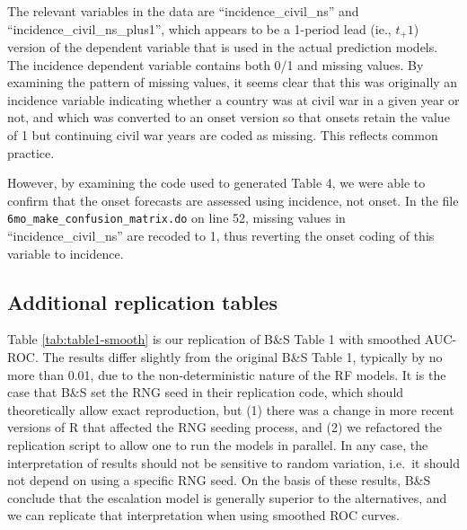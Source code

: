\documentclass[
]{article}
\begin{document}
The relevant variables in the data are ``incidence\_civil\_ns'' and ``incidence\_civil\_ns\_plus1'', which appears to be a 1-period lead (ie., \(t_+1\)) version of the dependent variable that is used in the actual prediction models. The incidence dependent variable contains both 0/1 and missing values. By examining the pattern of missing values, it seems clear that this was originally an incidence variable indicating whether a country was at civil war in a given year or not, and which was converted to an onset version so that onsets retain the value of 1 but continuing civil war years are coded as missing. This reflects common practice.

However, by examining the code used to generated Table 4, we were able to confirm that the onset forecasts are assessed using incidence, not onset. In the file \texttt{6mo\_make\_confusion\_matrix.do} on line 52, missing values in ``incidence\_civil\_ns'' are recoded to 1, thus reverting the onset coding of this variable to incidence.

\hypertarget{additional-replication-tables}{%
\subsection{Additional replication tables}\label{additional-replication-tables}}

Table \ref{tab:table1-smooth} is our replication of B\&S Table 1 with smoothed AUC-ROC. The results differ slightly from the original B\&S Table 1, typically by no more than 0.01, due to the non-deterministic nature of the RF models. It is the case that B\&S set the RNG seed in their replication code, which should theoretically allow exact reproduction, but (1) there was a change in more recent versions of R that affected the RNG seeding process, and (2) we refactored the replication script to allow one to run the models in parallel. In any case, the interpretation of results should not be sensitive to random variation, i.e.~it should not depend on using a specific RNG seed. On the basis of these results, B\&S conclude that the escalation model is generally superior to the alternatives, and we can replicate that interpretation when using smoothed ROC curves.
\end{document}
